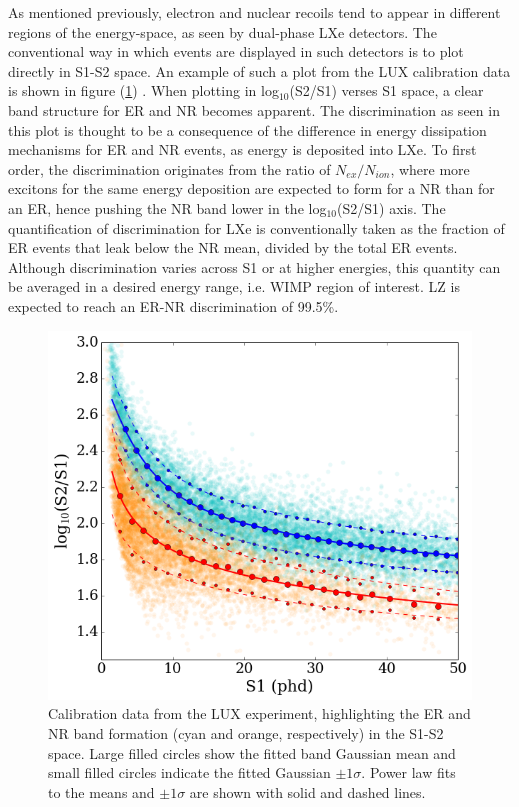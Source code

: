 As mentioned previously, electron and nuclear recoils tend to appear in different regions of the energy-space, as seen by dual-phase LXe detectors. The conventional way in which events are displayed in such detectors is to plot directly in S1-S2 space. An example of such a plot from the LUX calibration data is shown in figure (\ref{fig:er_nr_discrimination}) \cite{lux_signal_yields}. When plotting in log$_{10}$(S2/S1) verses S1 space, a clear band structure for ER and NR becomes apparent. The discrimination as seen in this plot is thought to be a consequence of the difference in energy dissipation mechanisms for ER and NR events, as energy is deposited into LXe. To first order, the discrimination originates from the ratio of $N_{ex}/N_{ion}$, where more excitons for the same energy deposition are expected to form for a NR than for an ER, hence pushing the NR band lower in the log$_{10}$(S2/S1) axis. The quantification of discrimination for LXe is conventionally taken as the fraction of ER events that leak below the NR mean, divided by the total ER events. Although discrimination varies across S1 or at higher energies, this quantity can be averaged in a desired energy range, i.e. WIMP region of interest. LZ is expected to reach an ER-NR discrimination of 99.5\%.
%
\begin{figure}[ht!]
    \begin{center}
        \includegraphics[scale=0.60]{Chapter_2/Figures/PAPER_logS2S1_ERNRBandData.png}
        \caption[Calibration data from the LUX experiment, highlighting the ER and NR band formations in the S1-S2 energy-space.]%
        {Calibration data from the LUX experiment, highlighting the ER and NR band formation (cyan and orange, respectively) in the S1-S2 space. Large filled circles show the fitted band Gaussian mean and small filled circles indicate the fitted Gaussian $\pm1\sigma$. Power law fits to the means and $\pm1\sigma$ are shown with solid and dashed lines.}
        \label{fig:er_nr_discrimination}
    \end{center}
\end{figure}
%


